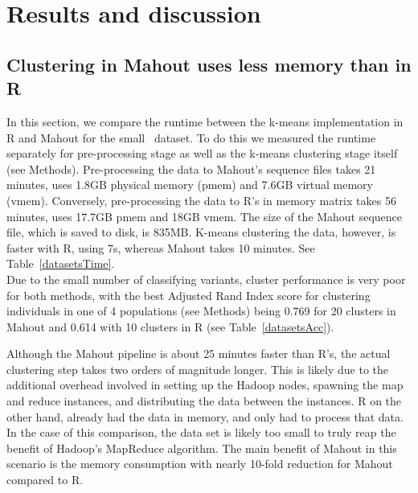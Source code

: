 \documentclass{bioinfo}
\begin{document}


\section*{Results and discussion}

\subsection*{Clustering in Mahout uses less memory than in R}
In this section, we compare the runtime between the k-means implementation in R and Mahout for the small \NinteenPhaseone\ dataset. 
To do this we measured the runtime separately for pre-processing stage as well as the k-means clustering stage itself (see Methods). 
Pre-processing the data to Mahout's sequence files takes 21 minutes, uses 1.8GB physical memory (pmem) and 7.6GB virtual memory (vmem).
Conversely,  pre-processing the data to R's in memory matrix takes 56 minutes, uses 17.7GB pmem and 18GB vmem. 
The size of the Mahout sequence file, which is saved to disk, is 835MB. 
K-means clustering the data, however, is faster with R, using 7s, whereas Mahout takes 10 minutes. See Table~\ref{datasetsTime}. \\
Due to the small number of classifying variants, cluster performance is very poor for both methods, with the best Adjusted Rand Index score for clustering individuals in one of 4 populations (see Methods) being 0.769 for 20 clusters in Mahout and 0.614 with 10 clusters in R (see Table~\ref{datasetsAcc}).

Although the Mahout pipeline is about 25 minutes faster than R's, the actual clustering step takes two orders of magnitude longer. 
This is likely due to the additional overhead involved in setting up the Hadoop nodes, spawning the map and reduce instances, and distributing the data between the instances. 
R on the other hand, already had the data in memory, and only had to process that data. 
In the case of this comparison, the data set is likely too small to truly reap the benefit of Hadoop's MapReduce algorithm. 
The main benefit of Mahout in this scenario is the memory consumption with nearly 10-fold reduction for Mahout compared to R. 


\end{document}
